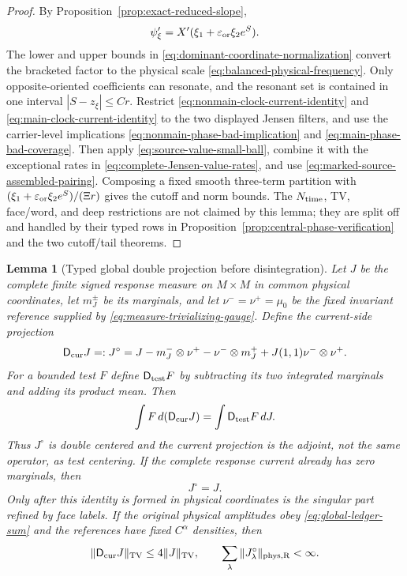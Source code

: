 \documentclass[11pt]{article}
\newtheorem{lemma}[theorem]{Lemma}
\begin{document}
\begin{proof}
By Proposition~\ref{prop:exact-reduced-slope},
\[
 \psi_\xi'=X'(\xi_1+\varepsilon_{\rm or}\xi_2e^S).
\]
The lower and upper bounds in
\eqref{eq:dominant-coordinate-normalization} convert the bracketed factor to
the physical scale \eqref{eq:balanced-physical-frequency}.  Only
opposite-oriented coefficients can resonate, and the resonant set is
contained in one interval $|S-z_\xi|\le Cr$.  Restrict
\eqref{eq:nonmain-clock-current-identity} and
\eqref{eq:main-clock-current-identity} to the two displayed Jensen filters,
and use the carrier-level implications
\eqref{eq:nonmain-phase-bad-implication} and
\eqref{eq:main-phase-bad-coverage}.  Then apply
\eqref{eq:source-value-small-ball}, combine it with the exceptional rates in
\eqref{eq:complete-Jensen-value-rates}, and use
\eqref{eq:marked-source-assembled-pairing}.  Composing a fixed smooth three-term
partition with
$(\xi_1+\varepsilon_{\rm or}\xi_2e^S)/(\Xi r)$ gives the cutoff and norm
bounds.  The $N_{\rm time}$, TV, face/word, and deep restrictions are not
claimed by this lemma; they are split off and handled by their typed rows in
Proposition~\ref{prop:central-phase-verification} and the two cutoff/tail
theorems.
\end{proof}
\begin{lemma}[Typed global double projection before disintegration]
\label{lem:global-label-recentering}
Let $J$ be the complete finite signed response measure on $M\times M$ in
common physical coordinates, let $m_J^\pm$ be its marginals, and let
$\nu^-=\nu^+=\mu_0$ be the fixed invariant reference supplied by
\eqref{eq:measure-trivializing-gauge}.  Define the
current-side projection
\begin{equation}
\label{eq:labelwise-recentering}
 \mathsf D_{\rm cur}J=:J^\circ
 =J-m_J^-\otimes\nu^+-\nu^-\otimes m_J^+
   +J(1,1)\nu^-\otimes\nu^+.
\end{equation}
For a bounded test $F$ define $\mathsf D_{\rm test}F$ by subtracting its two
integrated marginals and adding its product mean.  Then
\[
 \int F\,d(\mathsf D_{\rm cur}J)=
 \int \mathsf D_{\rm test}F\,dJ.
\]
Thus $J^\circ$ is double centered and the current projection is the adjoint,
not the same operator, as test centering.  If the complete response current
already has zero marginals, then
\begin{equation}
\label{eq:global-recentering-sum}
 J^\circ=J.
\end{equation}
Only after this identity is formed in physical coordinates is the singular
part refined by face labels.  If the original physical amplitudes obey
\eqref{eq:global-ledger-sum} and the references have fixed $C^\alpha$
densities, then
\begin{equation}
\label{eq:recenter-norm-ledger}
 \|\mathsf D_{\rm cur}J\|_{\rm TV}
 \le4\|J\|_{\rm TV},\qquad
 \sum_\lambda\|J_\lambda^\circ\|_{\rm phys,R}<\infty .
\end{equation}
\end{lemma}
\end{document}
